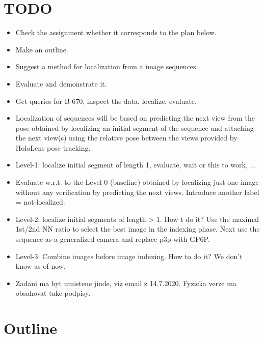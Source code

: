 \documentclass[twoside]{ctuthesis}
\theoremstyle{plain}
\theoremstyle{definition}
\theoremstyle{note}
\begin{document}
\maketitle

\chapter{TODO}

\begin{itemize}
    \item Check the assignment whether it corresponds to the plan below.
    \item Make an outline.
    \item Suggest a method for localization from a image sequences.
    \item Evaluate and demonstrate it.
    \item Get queries for B-670, inspect the data, localize, evaluate.
    \item Localization of sequences will be based on predicting the next view from the pose obtained by localizing an initial segment of the sequence and attaching the next view(s) using the relative pose between the views provided by HoloLens pose tracking. 
    \item Level-1: localize initial segment of length 1, evaluate, wait or this to work, ...
    \item Evaluate w.r.t. to the Level-0 (baseline) obtained by localizing just one image without any verification by predicting the next views. Introduce another label = not-localized.
    \item Level-2: localize initial segments of length > 1. How t do it? Use the maximal 1st/2nd NN ratio to select the best image in the indexing phase. Next use the sequence as a generalized camera and replace p3p with GP6P. 
	\item Level-3: Combine images before image indexing. How to do it? We don't know as of now.
	\item Zadani ma byt umistene jinde, viz email z 14.7.2020. Fyzicka verze ma obsahovat take podpisy.
\end{itemize}

\chapter{Outline}
\end{document}
